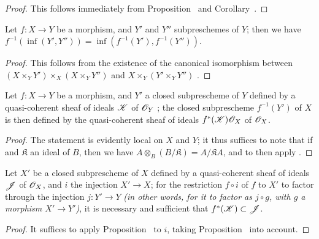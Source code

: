 \begin{proof}
\label{proof-I.4.4.3}
This follows immediately from Proposition~ and Corollary~.
\end{proof}

\begin{corollary}[4.4.4]
\label{I.4.4.4}
Let $f:X\to Y$ be a morphism, and $Y'$ and $Y''$ subpreschemes of $Y$;
then we have $f^{-1}(\inf(Y',Y''))=\inf(f^{-1}(Y'),f^{-1}(Y''))$.
\end{corollary}

\begin{proof}
\label{proof-I.4.4.4}
This follows from the existence of the canonical isomorphism between $(X\times_Y Y')\times_X(X\times_Y Y'')$ and $X\times_Y(Y'\times_Y Y'')$ .
\end{proof}

\begin{proposition}[4.4.5]
\label{I.4.4.5}
Let $f:X\to Y$ be a morphism, and $Y'$ a closed subprescheme of $Y$ defined by a quasi-coherent sheaf of ideals $\mathscr{K}$ of $\mathscr{O}_Y$ ;
the closed subprescheme $f^{-1}(Y')$ of $X$ is then defined by the quasi-coherent sheaf of ideals $f^*(\mathscr{K})\mathscr{O}_X$ of $\mathscr{O}_X$.
\end{proposition}

\begin{proof}
\label{proof-I.4.4.5}
The statement is evidently local on $X$ and $Y$;
it thus suffices to note that if  and $\mathfrak{K}$ an ideal of $B$, then we have $A\otimes_B(B/\mathfrak{K})=A/\mathfrak{K}A$, and to then apply .
\end{proof}

\begin{corollary}[4.4.6]
\label{I.4.4.6}
Let $X'$ be a closed subprescheme of $X$ defined by a quasi-coherent sheaf of ideals $\mathscr{J}$ of $\mathscr{O}_X$, and $i$ the injection $X'\to X$;
for the restriction $f\circ i$ of $f$ to $X'$ to factor through the injection $j:Y'\to Y$ \emph{(in other words, for it to factor as $j\circ g$, with $g$ a morphism $X'\to Y'$)}, it is necessary and sufficient that $f^*(\mathscr{K})\subset\mathscr{J}$.
\end{corollary}

\begin{proof}
\label{proof-I.4.4.6}
It suffices to apply Proposition~ to $i$, taking Proposition~ into account.
\end{proof}

